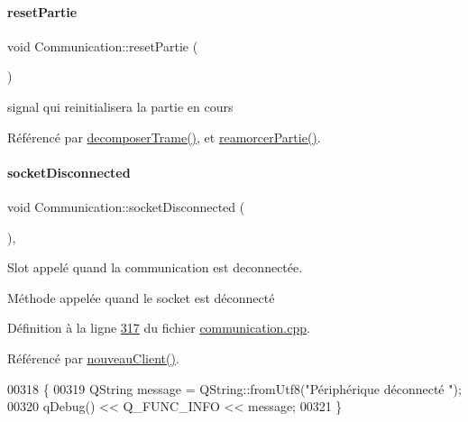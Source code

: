 \paragraph{\texorpdfstring{reset\+Partie}{resetPartie}}
{\footnotesize\ttfamily void Communication\+::reset\+Partie (\begin{DoxyParamCaption}{ }\end{DoxyParamCaption})\hspace{0.3cm}{\ttfamily [signal]}}



signal qui reinitialisera la partie en cours 



Référencé par \hyperlink{communication_8cpp_source_l00188}{decomposer\+Trame()}, et \hyperlink{communication_8cpp_source_l00305}{reamorcer\+Partie()}.

\mbox{\label{class_communication_a44f863f2c70f4be652224240447c9fe0}} 
\paragraph{\texorpdfstring{socket\+Disconnected}{socketDisconnected}}
{\footnotesize\ttfamily void Communication\+::socket\+Disconnected (\begin{DoxyParamCaption}{ }\end{DoxyParamCaption})\hspace{0.3cm}{\ttfamily [private]}, {\ttfamily [slot]}}



Slot appelé quand la communication est deconnectée. 

Méthode appelée quand le socket est déconnecté 

Définition à la ligne \hyperlink{communication_8cpp_source_l00317}{317} du fichier \hyperlink{communication_8cpp_source}{communication.\+cpp}.



Référencé par \hyperlink{communication_8cpp_source_l00150}{nouveau\+Client()}.


\begin{DoxyCode}
00318 \{
00319     QString message = QString::fromUtf8(\textcolor{stringliteral}{"Périphérique déconnecté "});
00320     qDebug() << Q\_FUNC\_INFO << message;
00321 \}
\end{DoxyCode}
\mbox{\label{class_communication_a0576a95d1f3c4ec49172a1040cfbeedf}} 
